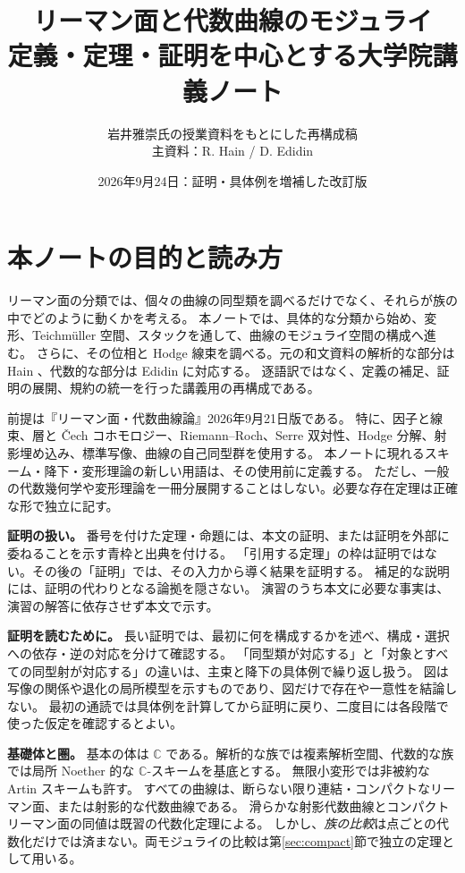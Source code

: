 \documentclass[dvipdfmx,a4paper,11pt]{article}
\title{リーマン面と代数曲線のモジュライ\\[4mm]\large 定義・定理・証明を中心とする大学院講義ノート}
\author{岩井雅崇氏の授業資料をもとにした再構成稿\\\small 主資料：R. Hain / D. Edidin}
\date{2026年9月24日：証明・具体例を増補した改訂版}
\theoremstyle{definition}
\newcommand{\C}{\mathbb C}\newcommand{\R}{\mathbb R}\newcommand{\Z}{\mathbb Z}\newcommand{\Q}{\mathbb Q}
\begin{document}
\maketitle
\section*{本ノートの目的と読み方}
リーマン面の分類では、個々の曲線の同型類を調べるだけでなく、それらが族の中でどのように動くかを考える。
本ノートでは、具体的な分類から始め、変形、Teichmüller 空間、スタックを通して、曲線のモジュライ空間の構成へ進む。
さらに、その位相と Hodge 線束を調べる。元の和文資料の解析的な部分は Hain \cite{Hain}、代数的な部分は Edidin \cite{Edidin} に対応する。
逐語訳ではなく、定義の補足、証明の展開、規約の統一を行った講義用の再構成である。

前提は『リーマン面・代数曲線論』2026年9月21日版である。
特に、因子と線束、層と Čech コホモロジー、Riemann--Roch、Serre 双対性、Hodge 分解、射影埋め込み、標準写像、曲線の自己同型群を使用する。
本ノートに現れるスキーム・降下・変形理論の新しい用語は、その使用前に定義する。
ただし、一般の代数幾何学や変形理論を一冊分展開することはしない。必要な存在定理は正確な形で独立に記す。

\textbf{証明の扱い。}
番号を付けた定理・命題には、本文の証明、または証明を外部に委ねることを示す青枠と出典を付ける。
「引用する定理」の枠は証明ではない。その後の「証明」では、その入力から導く結果を証明する。
補足的な説明には、証明の代わりとなる論拠を隠さない。
演習のうち本文に必要な事実は、演習の解答に依存させず本文で示す。

\textbf{証明を読むために。}
長い証明では、最初に何を構成するかを述べ、構成・選択への依存・逆の対応を分けて確認する。
「同型類が対応する」と「対象とすべての同型射が対応する」の違いは、主束と降下の具体例で繰り返し扱う。
図は写像の関係や退化の局所模型を示すものであり、図だけで存在や一意性を結論しない。
最初の通読では具体例を計算してから証明に戻り、二度目には各段階で使った仮定を確認するとよい。

\textbf{基礎体と圏。}
基本の体は $\C$ である。解析的な族では複素解析空間、代数的な族では局所 Noether 的な $\C$-スキームを基底とする。
無限小変形では非被約な Artin スキームも許す。
すべての曲線は、断らない限り連結・コンパクトなリーマン面、または射影的な代数曲線である。
滑らかな射影代数曲線とコンパクトリーマン面の同値は既習の代数化定理による。
しかし、\emph{族の比較}は点ごとの代数化だけでは済まない。両モジュライの比較は第\ref{sec:compact}節で独立の定理として用いる。

\clearpage
\end{document}
